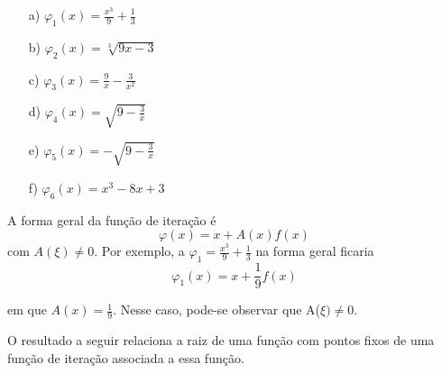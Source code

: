 \begin{multicols}{2}
\begin{itemize} %
    \item[a)] $\varphi_1(x) = \frac{x^3}{9} + \frac{1}{3}$
    \item[b)] $\varphi_2(x) = \sqrt[3]{9x-3}$
    \item[c)] $\varphi_3(x) = \frac{9}{x} - \frac{3}{x^2}$
    \item[d)] $\varphi_4(x) = \sqrt{9 - \frac{3}{x}}$
    \item[e)] $\varphi_5(x) = -\sqrt{9 - \frac{3}{x}}$
    \item[f)] $\varphi_6(x) = x^3 - 8x + 3$
\end{itemize}
\end{multicols}
A forma geral da função de iteração é 
\begin{equation}
    \varphi(x) = x + A(x)f(x) \label{it}
\end{equation}
com $A(\xi) \ne 0$. %
Por exemplo, a $\varphi_1 = \frac{x^3}{9} + \frac{1}{3}$ na forma geral ficaria 
\begin{equation*}
    \varphi_1(x) = x + \frac{1}{9}f(x)
\end{equation*}
\begin{comment}
    \varphi_1(x) &= x + \frac{1}{9}(x^3 - 9x + 3) \\
    \varphi_1(x) &= x + \frac{x^3}{9} - x + \frac{1}{3} \\
    \varphi_1(x) &= \frac{x^3}{9} + \frac{1}{3}
\end{comment}
em que $A(x) = \frac{1}{9}$. Nesse caso, pode-se observar que A($\xi) \neq 0$.

O resultado a seguir relaciona a raiz de uma função com pontos fixos de uma função de iteração associada a essa função. %

